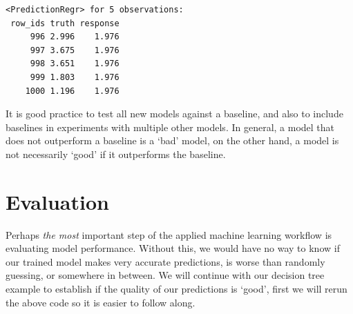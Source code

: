 \begin{Shaded}
\begin{Highlighting}[]
\OtherTok{=} \NormalTok{(}\NormalTok{(} \NormalTok{(}\NormalTok{), } \NormalTok{(}\NormalTok{, }\NormalTok{, }\NormalTok{)),}
   \NormalTok{)}
\NormalTok{(}\NormalTok{)}\SpecialCharTok{$}\SpecialCharTok{:}\NormalTok{)}\SpecialCharTok{$}\SpecialCharTok{:}\NormalTok{)}
\end{Highlighting}
\end{Shaded}

\begin{verbatim}
<PredictionRegr> for 5 observations:
 row_ids truth response
     996 2.996    1.976
     997 3.675    1.976
     998 3.651    1.976
     999 1.803    1.976
    1000 1.196    1.976
\end{verbatim}

It is good practice to test all new models against a baseline, and also
to include baselines in experiments with multiple other models. In
general, a model that does not outperform a baseline is a `bad' model,
on the other hand, a model is not necessarily `good' if it outperforms
the baseline.

\hypertarget{sec-eval}{%
\section{Evaluation}\label{sec-eval}}

Perhaps \emph{the most} important step of the applied machine learning
workflow is evaluating model performance. Without this, we would have no
way to know if our trained model makes very accurate predictions, is
worse than randomly guessing, or somewhere in between. We will continue
with our decision tree example to establish if the quality of our
predictions is `good', first we will rerun the above code so it is
easier to follow along.

\begin{Shaded}
\begin{Highlighting}[]
\OtherTok{=} \NormalTok{(}\NormalTok{)}
\OtherTok{=} \NormalTok{(}\NormalTok{)}
\OtherTok{=} 
\SpecialCharTok{$}\SpecialCharTok{$}
\OtherTok{=}\SpecialCharTok{$}\SpecialCharTok{$}
\end{Highlighting}
\end{Shaded}

